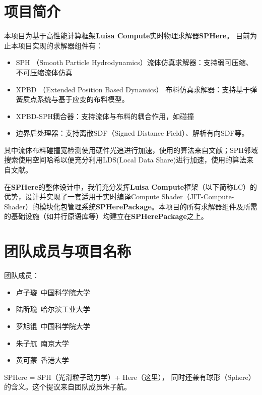 \section{项目简介}
本项目为基于高性能计算框架\textbf{Luisa Compute}\cite{Zheng2022LuisaRender}实时物理求解器\textbf{SPHere}。
目前为止本项目实现的求解器组件有：
\begin{itemize}
	\item SPH （Smooth Particle Hydrodynamics）流体仿真求解器：支持弱可压缩、不可压缩流体仿真
	\item XPBD （Extended Position Based Dynamics） 布料仿真求解器：支持基于弹簧质点系统与基于应变的布料模型。
	\item XPBD-SPH耦合器：支持流体与布料的耦合作用，如碰撞
	\item 边界后处理器：支持离散SDF（Signed Distance Field）、解析有向SDF等。
\end{itemize}

其中流体布料碰撞宽检测使用硬件光追进行加速，使用的算法来自文献\cite{rtCollision2022}；SPH邻域搜索使用空间哈希以便充分利用LDS(Local Data Share)进行加速，使用的算法来自文献\cite{huangSPH2019}。

在\textbf{SPHere}的整体设计中，我们充分发挥\textbf{Luisa Compute}框架（以下简称LC）的优势，设计并实现了一套适用于实时编译Compute Shader（JIT-Compute-Shader）的模块化包管理系统\textbf{SPHerePackage}。本项目的所有求解器组件及所需的基础设施（如并行原语库等）均建立在\textbf{SPHerePackage}之上。

\section{团队成员与项目名称}
团队成员：
\begin{itemize}
	\item 卢子璇~中国科学院大学
	\item 陆昕瑜~哈尔滨工业大学
	\item 罗旭锟~中国科学院大学
	\item 朱子航~南京大学
	\item 黄可蒙~香港大学
\end{itemize}

SPHere = SPH（光滑粒子动力学）+ Here（这里）， 同时还兼有球形（Sphere）的含义。这个提议来自团队成员朱子航。

